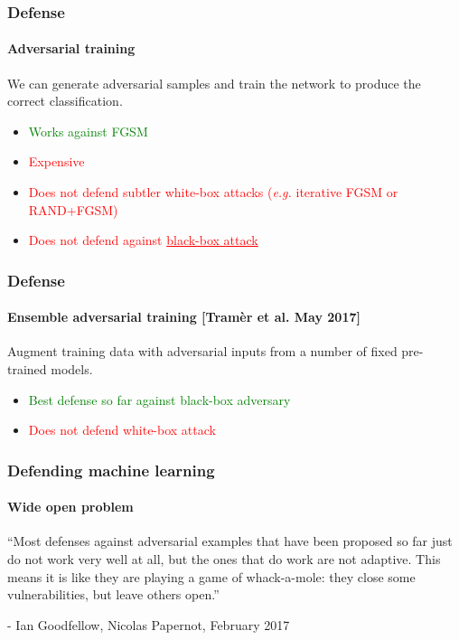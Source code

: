 \documentclass[9pt]{beamer}
\begin{document}
\begin{frame}
  \frametitle{Defense}

  \framesubtitle{Adversarial training}

  We can generate adversarial samples and train the network to produce
  the correct classification.

  \medskip

  \begin{itemize}
  \item \textcolor{green}{Works against FGSM}
  \item \textcolor{red}{Expensive}
  \item \textcolor{red}{Does not defend subtler white-box
    attacks (\textit{e.g.} iterative FGSM or RAND+FGSM)}
  \item \textcolor{red}{Does not defend against \underline{black-box attack}}
  \end{itemize}
\end{frame}

\begin{frame}
  \frametitle{Defense}

  \framesubtitle{Ensemble adversarial training [Tramèr et al. May 2017]}

  Augment training data with adversarial inputs from a number of fixed
  pre-trained models.

  \medskip

  \begin{itemize}
  \item \textcolor{green}{Best defense so far against black-box adversary}
  \item \textcolor{red}{Does not defend white-box attack}
  \end{itemize}
\end{frame}

\begin{frame}

  \frametitle{Defending machine learning}

  \framesubtitle{Wide open problem}

  ``Most defenses against adversarial examples that have been proposed
  so far just do not work very well at all, but the ones that do work
  are not adaptive. This means it is like they are playing a game of
  whack-a-mole: they close some vulnerabilities, but leave others
  open.''

  \bigskip

  - Ian Goodfellow, Nicolas Papernot, February 2017
\end{frame}
\end{document}
